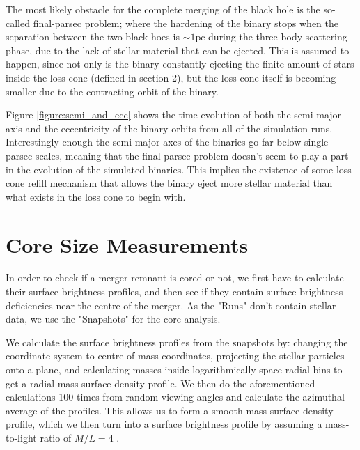 \documentclass[english, oneside]{HYgradu}
\begin{document}

The most likely obstacle for the complete merging of the black hole is the so-called final-parsec problem; where the hardening of the binary stops when the separation between the two black hoes is $\sim 1 \mathrm{pc}$ during the three-body scattering phase, due to the lack of stellar material that can be ejected. This is assumed to happen, since not only is the binary constantly ejecting the finite amount of stars inside the loss cone (defined in section 2), but the loss cone itself is becoming smaller due to the contracting orbit of the binary.

Figure \ref{figure:semi_and_ecc} shows the time evolution of both the semi-major axis and the eccentricity of the binary orbits from all of the simulation runs. Interestingly enough the semi-major axes of the binaries go far below single parsec scales, meaning that the final-parsec problem doesn't seem to play a part in the evolution of the simulated binaries. This implies the existence of some loss cone refill mechanism that allows  the binary eject more stellar material than what exists in the loss cone to begin with.


\section{Core Size Measurements}

In order to check if a merger remnant is cored or not, we first have to calculate their surface brightness profiles, and then see if they contain surface brightness deficiencies near the centre of the merger. As the "Runs" don't contain stellar data, we use the "Snapshots" for the core analysis. 

We calculate the surface brightness profiles from the snapshots by: changing the coordinate system to centre-of-mass coordinates, projecting the stellar particles onto a plane, and calculating masses inside logarithmically space radial bins to get a radial mass surface density profile. We then do the aforementioned calculations 100 times from random viewing angles and calculate the azimuthal average of the profiles. This allows us to form a smooth mass surface density profile, which we then turn into a surface brightness profile by assuming a mass-to-light ratio of $M/L = 4$ \citep{Rantala2018}.
\end{document}
